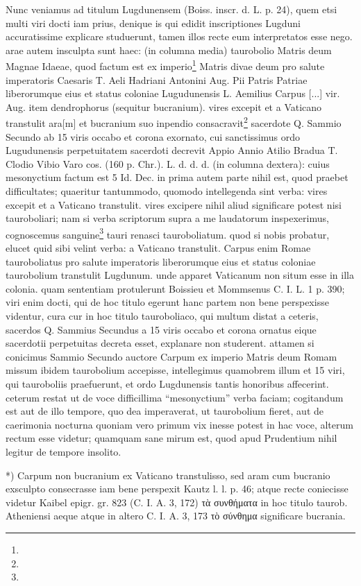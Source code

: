 \documentclass[a4paper, 11pt, oneside, polutonikogreek, german]{article}
\begin{document}
Nunc veniamus ad titulum Lugdunensem (Boiss. inscr. d. L. p. 24), quem etsi multi viri docti iam prius, denique is qui edidit inscriptiones Lugduni accuratissime explicare studuerunt, tamen illos recte eum interpretatos esse nego. arae autem insculpta sunt haec: (in columna media) taurobolio Matris deum Magnae Idaeae, quod factum est ex imperio\footnote{} Matris divae deum pro salute imperatoris Caesaris T. Aeli Hadriani Antonini Aug. Pii Patris Patriae liberorumque eius et status coloniae Lugudunensis L. Aemilius Carpus [...] vir. Aug. item dendrophorus (sequitur bucranium). vires excepit et a Vaticano transtulit ara[m] et bucranium suo inpendio consacravit\footnote{} sacerdote Q. Sammio Secundo ab 15 viris occabo et corona exornato, cui sanctissimus ordo Lugudunensis perpetuitatem sacerdoti decrevit Appio Annio Atilio Bradua T. Clodio Vibio Varo cos. (160 p. Chr.). L. d. d. d. (in columna dextera): cuius mesonyctium factum est 5 Id. Dec. in prima autem parte nihil est, quod praebet difficultates; quaeritur tantummodo, quomodo intellegenda sint verba: vires excepit et a Vaticano transtulit. vires excipere nihil aliud significare potest nisi tauroboliari; nam si verba scriptorum supra a me laudatorum inspexerimus, cognoscemus sanguine\footnote{} tauri renasci tauroboliatum. quod si nobis probatur, elucet quid sibi velint verba: a Vaticano transtulit. Carpus enim Romae tauroboliatus pro salute imperatoris liberorumque eius et status coloniae taurobolium transtulit Lugdunum. unde apparet Vaticanum non situm esse in illa colonia. quam sententiam protulerunt Boissieu et Mommsenus C. I. L. 1 p. 390; viri enim docti, qui de hoc titulo egerunt hanc partem non bene perspexisse videntur, cura cur in hoc titulo tauroboliaco, qui multum distat a ceteris, sacerdos Q. Sammius Secundus a 15 viris occabo et corona ornatus eique sacerdotii perpetuitas decreta esset, explanare non studerent. attamen si conicimus Sammio Secundo auctore Carpum ex imperio Matris deum Romam missum ibidem taurobolium accepisse, intellegimus quamobrem illum et 15 viri, qui tauroboliis praefuerunt, et ordo Lugdunensis tantis honoribus affecerint. ceterum restat ut de voce difficillima "`mesonyctium"' verba faciam; cogitandum est aut de illo tempore, quo dea imperaverat, ut taurobolium fieret, aut de caerimonia nocturna quoniam vero primum vix inesse potest in hac voce, alterum rectum esse videtur; quamquam sane mirum est, quod apud Prudentium nihil legitur de tempore insolito.

*) Carpum non bucranium ex Vaticano transtulisso, sed aram cum bucranio exsculpto consecrasse iam bene perspexit Kautz l. l. p. 46; atque recte coniecisse videtur Kaibel epigr. gr. 823 (C. I. A. 3, 172) τὰ συνθήματα in hoc titulo taurob. Atheniensi aeque atque in altero C. I. A. 3, 173 τὸ σύνθημα significare bucrania.
\end{document}
